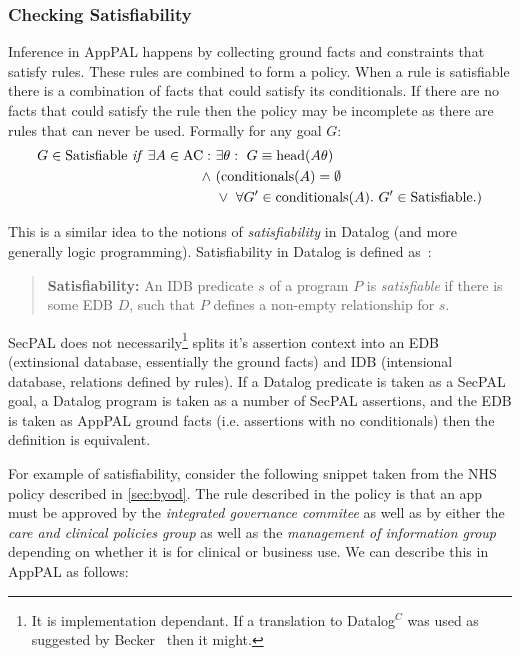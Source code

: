 \documentclass[a4paper]{scrartcl}
\begin{document}
\subsubsection{Checking Satisfiability}

Inference in AppPAL happens by collecting ground facts and constraints that
satisfy rules. These rules are combined to form a policy. When a rule is
satisfiable there is a combination of facts that could satisfy
its conditionals. If there are no facts that could satisfy the rule then the policy may be incomplete as there are rules that can never be
used.  Formally for any goal $G$:
\begin{align*}
  G \in \text{Satisfiable}~\text{\textit{if}}~\exists A \in \text{AC}:~&\exists \theta:~G\equiv\text{head}(A\theta) \\
                                                              \wedge~ & (\text{conditionals}(A) = \emptyset \\
                                                                      & \vee~\forall G^\prime \in \text{conditionals}(A).~G^\prime \in \text{Satisfiable}.)
\end{align*}

This is a similar idea to the notions of \emph{satisfiability} in Datalog (and
more generally logic programming).  Satisfiability in Datalog is defined
as~\cite{alon_levy_equivalence_1993}:

\begin{quote}
  \textbf{Satisfiability:} An IDB predicate $s$ of a program $P$ is
  \emph{satisfiable} if there is some EDB $D$, such that $P$ defines a
  non-empty relationship for $s$.
\end{quote}

SecPAL does not necessarily\footnote{It is implementation dependant. If a
  translation to Datalog$^C$ was used as suggested by
  Becker~\cite{becker_secpal:_2010} then it might.} splits it's assertion
  context into an EDB (extinsional database, essentially the ground facts) and
  IDB (intensional database, relations defined by rules).  If a Datalog
  predicate is taken as a SecPAL goal, a Datalog program is taken as a number
  of SecPAL assertions, and the EDB is taken as AppPAL ground facts (i.e.
  assertions with no conditionals) then the definition is equivalent.

For example of satisfiability, consider the following snippet taken from the
NHS policy described in \autoref{sec:byod}.  The rule described in the policy
is that an app must be approved by the \emph{integrated governance commitee} as
well as by either the \emph{care and clinical policies group} as well as the
\emph{management of information group} depending on whether it is for clinical
or business use. We can describe this in AppPAL as follows:
\end{document}

